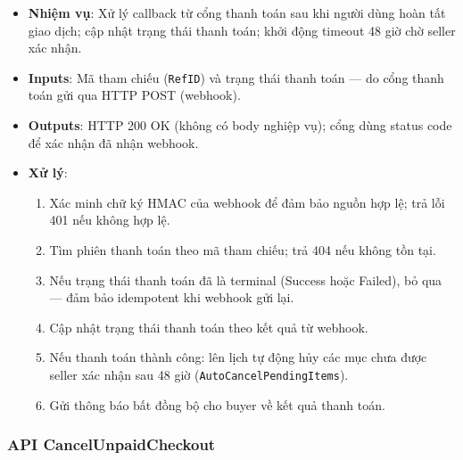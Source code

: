 \begin{itemize}[leftmargin=*]
  \item \textbf{Nhiệm vụ}: Xử lý callback từ cổng thanh toán sau khi người dùng hoàn tất giao dịch; cập nhật trạng thái thanh toán; khởi động timeout 48 giờ chờ seller xác nhận.
  \item \textbf{Inputs}: Mã tham chiếu (\texttt{RefID}) và trạng thái thanh toán --- do cổng thanh toán gửi qua HTTP POST (webhook).
  \item \textbf{Outputs}: HTTP 200 OK (không có body nghiệp vụ); cổng dùng status code để xác nhận đã nhận webhook.
  \item \textbf{Xử lý}:
    \begin{enumerate}
      \item Xác minh chữ ký HMAC của webhook để đảm bảo nguồn hợp lệ; trả lỗi 401 nếu không hợp lệ.
      \item Tìm phiên thanh toán theo mã tham chiếu; trả 404 nếu không tồn tại.
      \item Nếu trạng thái thanh toán đã là terminal (Success hoặc Failed), bỏ qua --- đảm bảo idempotent khi webhook gửi lại.
      \item Cập nhật trạng thái thanh toán theo kết quả từ webhook.
      \item Nếu thanh toán thành công: lên lịch tự động hủy các mục chưa được seller xác nhận sau 48 giờ (\texttt{AutoCancelPendingItems}).
      \item Gửi thông báo bất đồng bộ cho buyer về kết quả thanh toán.
    \end{enumerate}
\end{itemize}

\subsubsection{API CancelUnpaidCheckout}


